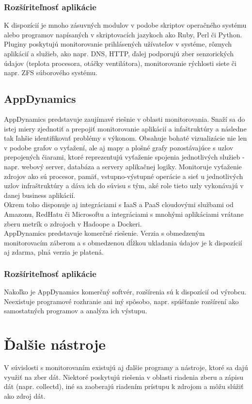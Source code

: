 \documentclass[printed,11pt,twoside,color,cover,table]{fithesis3}
\begin{document}
\subsubsection{Rozšíriteľnosť aplikácie}
K dispozícií je mnoho zásuvných modulov v podobe skriptov operačného systému alebo programov napísaných v skriptovacích jazykoch ako Ruby,
Perl či Python. Pluginy poskytujú monitorovanie prihlásených užívateľov v systéme, rôznych aplikácií a služieb, ako napr. DNS, HTTP, ďalej
podporujú zber senzorických údajov (teplota procesora, otáčky ventilátora), monitorovanie rýchlosti siete či napr. ZFS súborového systému.

\subsection{AppDynamics}
AppDynamics predstavuje zaujímavé riešnie v oblasti monitorovania. Snaží sa do istej miery zjednotiť a prepojiť monitorovanie aplikácií 
a infaštruktúry a následne tak ľahšie identifikovať problémy s výkonom. Obsahuje bohaté vizualizácie nie len v podobe grafov o vyťažení,
ale aj mapy a plošné grafy pozostávajúce s uzlov prepojených čiarami, ktoré reprezentujú vyťaženie spojenia jednotlivých služieb - 
napr. webový server, databáza a servery aplikačnej logiky. Monitoruje vyťaženie zdrojov ako sú procesor, pamäť, vstupno-výstupné operácie
a sieť u jednotlivých uzlov infraštruktúry a dáva ich do súvisu s tým, aké role tieto uzly vykonávajú v danej business aplikácií.
\\Okrem toho disponuje aj integráciami s IaaS a PaaS cloudovými službami od Amazonu, RedHatu či Microsoftu a integráciami s mnohými aplikáciami
vrátane zberu metrík o zdrojoch v Hadoope a Dockeri.\cite{appdyn}
\\AppDynamics predstavuje komerčné riešenie. Verzia s obmedzeným monitorovacím záberom a s obmedzenou dĺžkou ukladania údajov je k dispozícií aj zdarma, plná verzia je platená.

\subsubsection{Rozšíriteľnosť aplikácie}
Nakoľko je AppDynamics komerčný softvér, rozšírenia sú k dispozícií od výrobcu. Neexistuje programové rozhranie ani iný spôsobo, napr. spúšťanie rozšírení ako samostatných programov a analýza 
ich výstupu.

\section{Ďalšie nástroje}
V súvislosti s monitorovaním existujú aj ďalšie programy a nástroje, ktoré sa dajú využiť na zber dát. Niektoré poskytujú riešenia v oblasti riadenia zberu a zápisu dát (napr. collectd), iné
sa zaoberajú riadením prístupu k zdrojom a môžu slúžiť ako zdroj dát.
\end{document}
